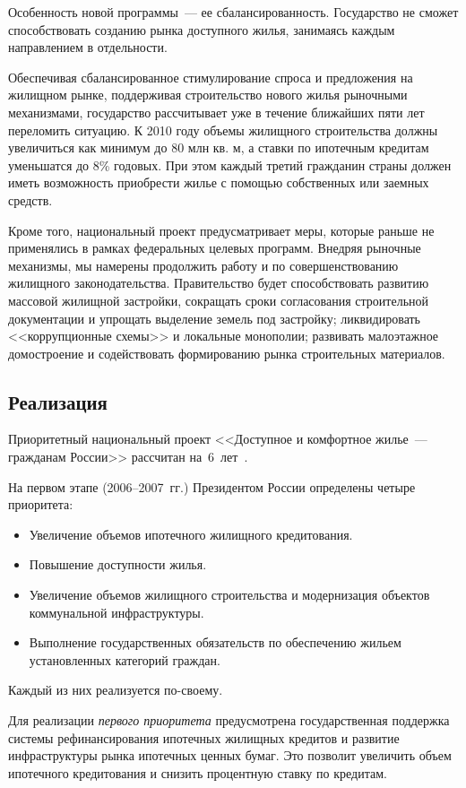 \documentclass[article, 12pt, russian, oneside]{ncc}
\begin{document}
Особенность новой программы~--- ее сбалансированность. Государство не
сможет способствовать созданию рынка доступного жилья, занимаясь
каждым направлением в отдельности.

Обеспечивая сбалансированное стимулирование спроса и предложения на
жилищном рынке, поддерживая строительство нового жилья рыночными
механизмами, государство рассчитывает уже в течение ближайших пяти лет
переломить ситуацию. К 2010 году объемы жилищного строительства должны
увеличиться как минимум до 80 млн кв. м, а ставки по ипотечным
кредитам уменьшатся до 8\% годовых. При этом каждый третий гражданин
страны должен иметь возможность приобрести жилье с помощью собственных
или заемных средств.

Кроме того, национальный проект предусматривает меры, которые раньше
не применялись в рамках федеральных целевых программ. Внедряя рыночные
механизмы, мы намерены продолжить работу и по совершенствованию
жилищного законодательства. Правительство будет способствовать
развитию массовой жилищной застройки, сокращать сроки согласования
строительной документации и упрощать выделение земель под застройку;
ликвидировать <<коррупционные схемы>> и локальные монополии; развивать
малоэтажное домостроение и содействовать формированию рынка
строительных материалов.


\subsection{Реализация}

Приоритетный национальный проект <<Доступное и комфортное жилье~---
гражданам России>> рассчитан на~6~лет~\cite{Hub_Goals}.

На первом этапе (2006--2007~гг.) Президентом России определены четыре
приоритета:

\begin{itemize}
\item Увеличение объемов ипотечного жилищного кредитования.
\item Повышение доступности жилья.
\item Увеличение объемов жилищного строительства и модернизация
  объектов коммунальной инфраструктуры.
\item Выполнение государственных обязательств по обеспечению жильем
  ус\-тановленных категорий граждан.
\end{itemize}

Каждый из них реализуется по-своему.

Для реализации \emph{первого приоритета} предусмотрена государственная
поддержка системы рефинансирования ипотечных жилищных кредитов и
развитие инфраструктуры рынка ипотечных ценных бумаг. Это позволит
увеличить объем ипотечного кредитования и снизить процентную ставку по
кредитам.
\end{document}
